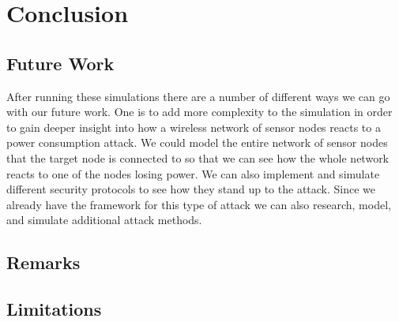 \section{Conclusion}
\subsection{Future Work}
After running these simulations there are a number of different ways 
we can go with our future work.  One is to add more complexity to 
the simulation in order to gain deeper insight into how a wireless 
network of sensor nodes reacts to a power consumption attack.  We 
could model the entire network of sensor nodes that the target node 
is connected to so that we can see how the whole network reacts to 
one of the nodes losing power. We can also implement and simulate 
different security protocols to see how they stand up to the attack.  
Since we already have the framework for this type of attack we can 
also research, model, and simulate additional attack methods.

 
\subsection{Remarks}
\subsection{Limitations}

